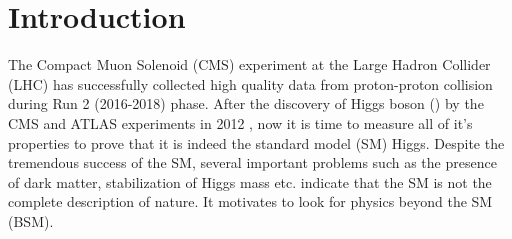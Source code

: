 \documentclass[12pt, a4paper]{article}
\DeclareRobustCommand{\PH}{{\HepParticle{H}{}{}}\xspace}
\begin{document}
\section{Introduction}\label{intro}
The Compact Muon Solenoid (CMS) experiment\cite{CMS:2008xjf} at the Large Hadron Collider (LHC) has successfully collected high quality data from proton-proton collision during Run 2 (2016-2018) phase. After the discovery of Higgs boson (\PH) by the CMS and ATLAS experiments in 2012  \cite{CMS:2012qbp,ATLAS:2012yve}, now it is time to measure all of it's properties to prove that it is indeed the standard model (SM) Higgs. Despite the tremendous success of the SM, several important problems such as the presence of dark matter, stabilization of Higgs mass etc. indicate that the SM is not the complete description of nature. It motivates to look for physics beyond the SM (BSM).
\end{document}
